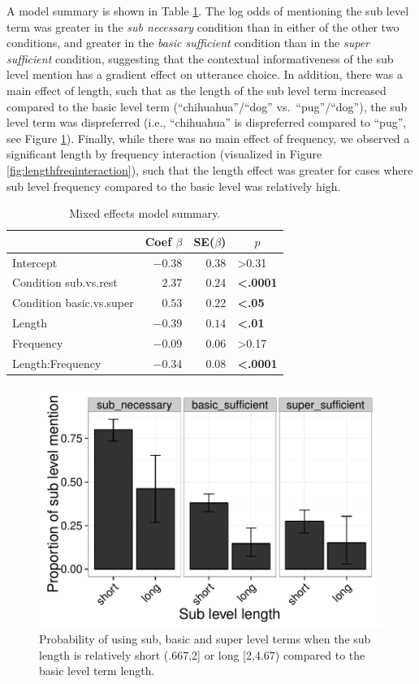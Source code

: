 \documentclass[10pt,letterpaper]{article}
\newcommand{\tableref}[1]{Table \ref{#1}}
\newcommand{\figref}[1]{Figure \ref{#1}}
\begin{document}
A model summary is shown in \tableref{tab:modelresults}. The log odds of mentioning the sub level term was greater in the \emph{sub necessary} condition than in either of the other two conditions, and greater in the \emph{basic sufficient} condition than in the \emph{super sufficient} condition, suggesting that the contextual informativeness of the sub level mention has a gradient effect on utterance choice. In addition, there was a main effect of length, such that as the length of the sub level term increased compared to the basic level term (``chihuahua''/``dog'' vs.~``pug''/``dog''), the sub level term was dispreferred (i.e., ``chihuahua'' is dispreferred compared to ``pug'', see \figref{fig:lengtheffect}). Finally, while there was no main effect of frequency, we observed a significant length by frequency interaction (visualized in \figref{fig:lengthfreqinteraction}), such that the length effect was greater for cases where sub level frequency compared to the basic level was relatively high. 


\begin{table}[!tbp]
\caption{Mixed effects model summary.}
\begin{center}
\begin{tabular}{lrrl}
\toprule
\multicolumn{1}{l}{}&\multicolumn{1}{c}{Coef $\beta$}&\multicolumn{1}{c}{SE($\beta$)}&\multicolumn{1}{c}{$p$}\tabularnewline
\midrule
Intercept&$-0.38$&$0.38$&\textgreater0.31\tabularnewline
Condition sub.vs.rest&$ 2.37$&$0.24$&\textbf{\textless.0001}\tabularnewline
Condition basic.vs.super&$ 0.53$&$0.22$&\textbf{\textless.05}\tabularnewline
Length&$-0.39$&$0.14$&\textbf{\textless.01}\tabularnewline
Frequency&$-0.09$&$0.06$&\textgreater0.17\tabularnewline
Length:Frequency&$-0.34$&$0.08$&\textbf{\textless.0001}\tabularnewline
\bottomrule
\end{tabular}\end{center}
\label{tab:modelresults}
\end{table}


\begin{figure}[ht!]
\centering
\includegraphics[width=.5\textwidth]{graphs/length-effect}
\caption{Probability of using sub, basic and super level terms when the sub  length is relatively short (.667,2] or long [2,4.67) compared to the basic level term length.}
 \label{fig:lengtheffect}
\end{figure}
\end{document}
